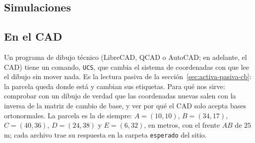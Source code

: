 \subsection{Simulaciones}


\subsection{En el CAD}\label{sec:cad-cap09}

Un programa de dibujo técnico (LibreCAD, QCAD o AutoCAD; en adelante, el CAD) tiene un comando,
\texttt{UCS}, que cambia el sistema de coordenadas con que lee el dibujo sin mover nada. Es la
lectura pasiva de la sección~\ref{sec:activa-pasiva-cb}: la parcela queda donde está y cambian
sus etiquetas. Para qué nos sirve: comprobar con un dibujo de verdad que las coordenadas nuevas
salen con la inversa de la matriz de cambio de base, y ver por qué el CAD solo acepta bases
ortonormales. La parcela es la de siempre: \(A=(10,10)\), \(B=(34,17)\), \(C=(40,36)\),
\(D=(24,38)\) y \(E=(6,32)\), en metros, con el frente \(AB\) de \(25\) m; cada archivo trae su
respuesta en la carpeta \texttt{esperado} del sitio.

